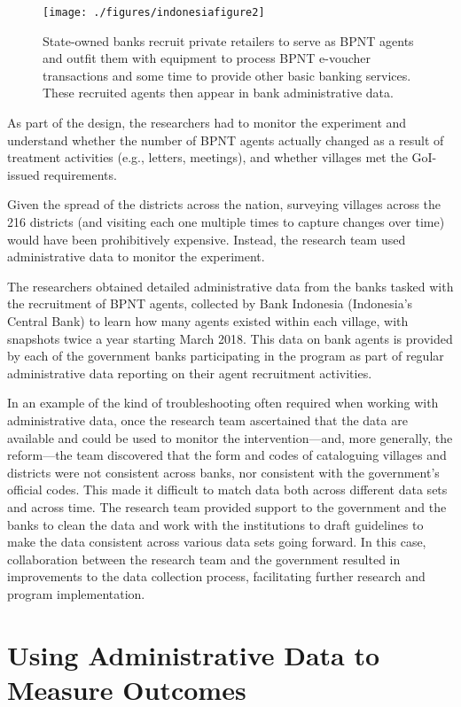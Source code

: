 \begin{figure}
\texttt{[image: ./figures/indonesiafigure2]} \caption{State-owned banks recruit private retailers to serve as BPNT agents and outfit them with equipment to process BPNT e-voucher transactions and some time to provide other basic banking services. These recruited agents then appear in bank administrative data.}\label{fig:indonesiafigure2}
\end{figure}

As part of the design, the researchers had to monitor the experiment and understand whether the number of BPNT agents actually changed as a result of treatment activities (e.g., letters, meetings), and whether villages met the GoI-issued requirements.

Given the spread of the districts across the nation, surveying villages across the 216 districts (and visiting each one multiple times to capture changes over time) would have been prohibitively expensive. Instead, the research team used administrative data to monitor the experiment.

The researchers obtained detailed administrative data from the banks tasked with the recruitment of BPNT agents, collected by Bank Indonesia (Indonesia's Central Bank) to learn how many agents existed within each village, with snapshots twice a year starting March 2018. This data on bank agents is provided by each of the government banks participating in the program as part of regular administrative data reporting on their agent recruitment activities.

In an example of the kind of troubleshooting often required when working with administrative data, once the research team ascertained that the data are available and could be used to monitor the intervention---and, more generally, the reform---the team discovered that the form and codes of cataloguing villages and districts were not consistent across banks, nor consistent with the government's official codes. This made it difficult to match data both across different data sets and across time. The research team provided support to the government and the banks to clean the data and work with the institutions to draft guidelines to make the data consistent across various data sets going forward. In this case, collaboration between the research team and the government resulted in improvements to the data collection process, facilitating further research and program implementation.

\hypertarget{using-administrative-data-to-measure-outcomes}{%
\section{Using Administrative Data to Measure Outcomes}\label{using-administrative-data-to-measure-outcomes}}

